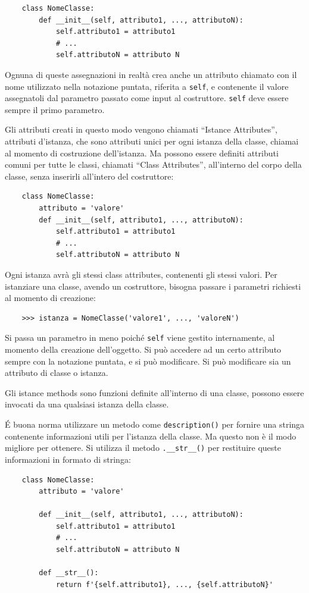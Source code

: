 \documentclass{article}
\numberwithin{equation}{subsection}
\begin{document}
\begin{verbatim}
    class NomeClasse:
        def __init__(self, attributo1, ..., attributoN):
            self.attributo1 = attributo1
            # ...
            self.attributoN = attributo N
\end{verbatim}

Ognuna di queste assegnazioni in realtà crea anche un attributo chiamato con il nome utilizzato nella notazione puntata, riferita 
a \verb|self|, e contenente il valore assegnatoli dal parametro passato come input al costruttore. \verb|self| deve 
essere sempre il primo parametro. 

Gli attributi creati in questo modo vengono chiamati ``Istance Attributes'', attributi d'istanza, che sono attributi 
unici per ogni istanza della classe, chiamai al momento di costruzione dell'istanza. Ma possono essere definiti attributi 
comuni per tutte le classi, chiamati ``Class Attributes'', all'interno del corpo della classe, senza inserirli 
all'intero del costruttore:

\begin{verbatim}
    class NomeClasse:
        attributo = 'valore' 
        def __init__(self, attributo1, ..., attributoN):
            self.attributo1 = attributo1
            # ...
            self.attributoN = attributo N
\end{verbatim}

Ogni istanza avrà gli stessi class attributes, contenenti gli stessi valori. Per istanziare una classe, avendo 
un costruttore, bisogna passare i parametri richiesti al momento di creazione:
\begin{verbatim}
    >>> istanza = NomeClasse('valore1', ..., 'valoreN')
\end{verbatim}

Si passa un parametro in meno poiché \verb|self| viene gestito internamente, al momento della creazione dell'oggetto. Si 
può accedere ad un certo attributo sempre con la notazione puntata, e si può modificare. Si può modificare 
sia un attributo di classe o istanza. 

Gli istance methods sono funzioni definite all'interno di una classe, possono essere invocati da una qualsiasi istanza 
della classe. 

\'{E} buona norma utilizzare un metodo come \verb|description()| per fornire una stringa contenente informazioni utili per 
l'istanza della classe. Ma questo non è il modo migliore per ottenere. Si utilizza il metodo \verb|.__str__()| per 
restituire queste informazioni in formato di stringa:
\begin{verbatim}
    class NomeClasse:
        attributo = 'valore' 
        
        def __init__(self, attributo1, ..., attributoN):
            self.attributo1 = attributo1
            # ...
            self.attributoN = attributo N
        
        def __str__():
            return f'{self.attributo1}, ..., {self.attributoN}'
\end{verbatim}
\end{document}
